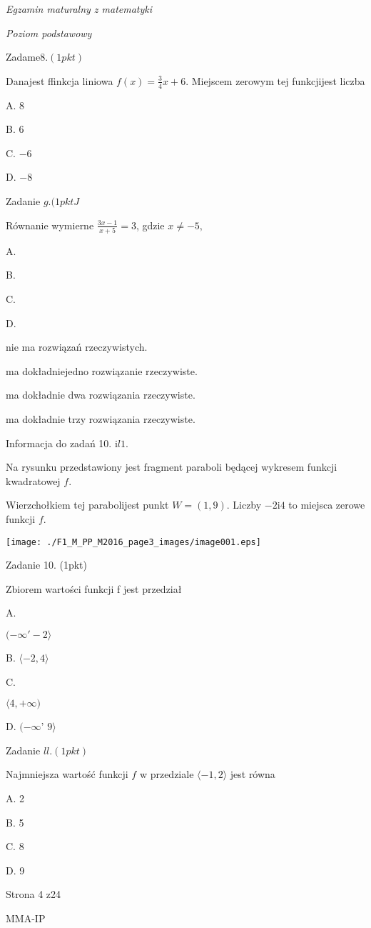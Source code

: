 \documentclass[a4paper,12pt]{article}
\begin{document}
{\it Egzamin maturalny z matematyki}

{\it Poziom podstawowy}

Zadam$\mathrm{e}8. (1pkt)$

Danajest ffinkcja liniowa $f(x)=\displaystyle \frac{3}{4}x+6$. Miejscem zerowym tej funkcjijest liczba

A. 8

B. 6

C. $-6$

D. $-8$

Zadanie $g. (1pktJ$

Równanie wymierne $\displaystyle \frac{3x-1}{x+5}=3$, gdzie $x\neq-5,$

A.

B.

C.

D.

nie ma rozwiązań rzeczywistych.

ma dokładniejedno rozwiązanie rzeczywiste.

ma dokładnie dwa rozwiązania rzeczywiste.

ma dokładnie trzy rozwiązania rzeczywiste.

Informacja do zadań 10. $\mathrm{i}l1.$

Na rysunku przedstawiony jest fragment paraboli będącej wykresem funkcji kwadratowej $f.$

Wierzchołkiem tej parabolijest punkt $W=(1,9)$. Liczby $-2\mathrm{i}4$ to miejsca zerowe funkcji $f.$
\begin{center}
\texttt{[image: ./F1\_M\_PP\_M2016\_page3\_images/image001.eps]}
\end{center}
Zadanie 10. (1pkt)

Zbiorem wartości funkcji f jest przedział

A.

$(-\infty'-2\rangle$

B. $\langle-2,  4\rangle$

C.

$\langle 4,+\infty)$

D. $(-\infty$' $ 9\rangle$

Zadanie $ll. (1pkt)$

Najmniejsza wartość funkcji $f$ w przedziale $\langle-1,2\rangle$ jest równa

A. 2

B. 5

C. 8

D. 9

Strona 4 z24

MMA-IP
\end{document}
